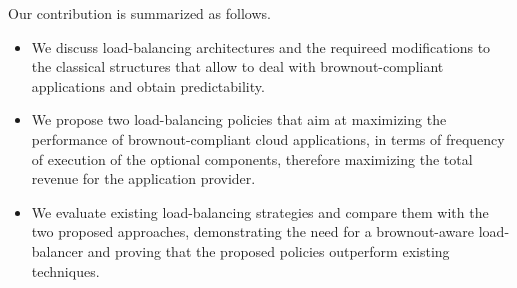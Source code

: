 Our contribution is summarized as follows.
\begin{itemize}
\item We discuss load-balancing architectures and the requireed
  modifications to the classical structures that allow to deal with
  brownout-compliant applications and obtain predictability.
\item We propose two load-balancing policies that aim at maximizing
  the performance of brownout-compliant cloud applications, in terms
  of frequency of execution of the optional components, therefore
  maximizing the total revenue for the application provider.
\item We evaluate existing load-balancing strategies and compare them
  with the two proposed approaches, demonstrating the need for a
  brownout-aware load-balancer and proving that the proposed policies
  outperform existing techniques.
\end{itemize}
